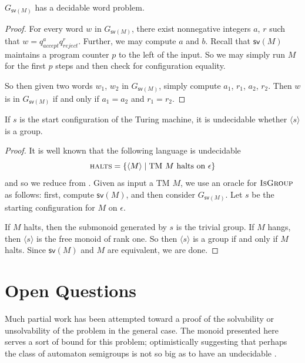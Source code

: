 \documentclass[11pt, titlepage]{article}
\begin{document}
\begin{proposition}
  $G_{\textsf{sv}(M)}$ has a decidable word problem.
\end{proposition}

\begin{proof}
  For every word $w$ in $G_{\textsf{sv}(M)}$, there exist nonnegative
  integers $a$, $r$ such that $w = q_{accept}^a
  q_{reject}^r$. Further, we may compute $a$ and $b$. Recall that
  $\textsf{sv}(M)$ maintains a program counter $p$ to the left of the
  input. So we may simply run $M$ for the first $p$ steps and then
  check for configuration equality.

  So then given two words $w_1$, $w_2$ in $G_{\textsf{sv}(M)}$, simply
  compute $a_1$, $r_1$, $a_2$, $r_2$. Then $w$ is in
  $G_{\textsf{sv}(M)}$ if and only if $a_1 = a_2$ and $r_1 = r_2$.
\end{proof}

\begin{proposition}
If $s$ is the start configuration of the Turing
machine, it is undecidable whether $\langle s \rangle$ is a group.
\end{proposition}

\begin{proof}
  It is well known that the following language is undecidable
  \[
    \textsc{halts} = \{\langle M \rangle \mid \text{TM $M$ halts on
      $\epsilon$} \}
  \]
  and so we reduce from . Given as input a TM $M$, we
  use an oracle for $\textsc{IsGroup}$ as follows: first, compute
  $\textsf{sv}(M)$, and then consider $G_{\textsf{sv}(M)}$. Let $s$ be
  the starting configuration for $M$ on $\epsilon$.

  If $M$ halts, then the submonoid generated by $s$ is the trivial
  group. If $M$ hangs, then $\langle s \rangle$ is the free monoid of
  rank one. So then $\langle s \rangle$ is a group if and only if $M$
  halts. Since $\textsf{sv}(M)$ and $M$ are equivalent, we are done.
\end{proof}


\section{Open Questions}

Much partial work has been attempted toward a proof of the solvability
or unsolvability of the  problem in the general
case. The monoid presented here serves a sort of bound for this
problem; optimistically suggesting that perhaps the class of automaton
semigroups is not so big as to have an undecidable .
\end{document}
